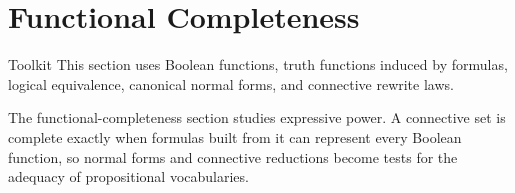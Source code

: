 \section{Functional Completeness}

\begin{toolkitbox}{Toolkit}
This section uses Boolean functions, truth functions induced by formulas,
logical equivalence, canonical normal forms, and connective rewrite laws.
\end{toolkitbox}

\begin{remark*}[Exposition]
The functional-completeness section studies expressive power. A connective
set is complete exactly when formulas built from it can represent every
Boolean function, so normal forms and connective reductions become tests for
the adequacy of propositional vocabularies.
\end{remark*}











